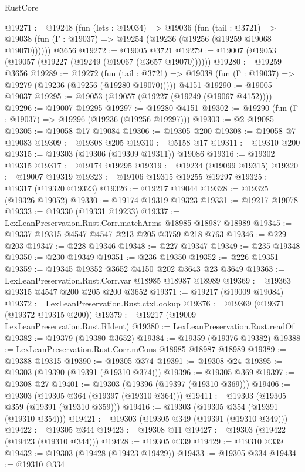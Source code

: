 \begin{lexlean}{RustCore}
\begin{coremodule}
@19271 := @19248
    (fun (lets : @19034) =>
    @19036
      (fun (tail : @3721) =>
      @19038 (fun (Γ : @19037) => @19254 (@19236 (@19256 (@19259 @19068 @19070))))))
    @3656
@19272 := @19005 @3721
@19279 := @19007 (@19053 (@19057 (@19227 (@19249 (@19067 (@3657 @19070))))))
@19280 := @19259 @3656
@19289 := @19272
    (fun (tail : @3721) => @19038 (fun (Γ : @19037) => @19279 (@19236 (@19256 (@19280 @19070)))))
    @4151
@19290 := @19005 @19037
@19295 := @19053 (@19057 (@19227 (@19249 (@19067 @4152))))
@19296 := @19007 @19295
@19297 := @19280 @4151
@19302 := @19290 (fun (Γ : @19037) => @19296 (@19236 (@19256 @19297)))
@19303 := @2 @19085
@19305 := @19058 @17 @19084
@19306 := @19305 @200
@19308 := @19058 @7 @19083
@19309 := @19308 @205
@19310 := @5158 @17
@19311 := @19310 @200
@19315 := @19303 (@19306 (@19309 @19311)) @19086
@19316 := @19302 @19315
@19317 := @19174 @19295
@19319 := @19234 (@19099 @19315)
@19320 := @19007 @19319
@19323 := @19106 @19315 @19255 @19297
@19325 := @19317 (@19320 @19323)
@19326 := @19217 @19044
@19328 := @19325 (@19326 @19052)
@19330 := @19174 @19319 @19323
@19331 := @19217 @19078
@19333 := @19330 (@19331 @19233)
@19337 := LexLeanPreservation.Rust.Corr.matchArms @18985 @18987 @18989
@19345 := @19337 @19315 @4547 @4547 @213 @205 @3759 @218 @763
@19346 := @229 @203
@19347 := @228 @19346
@19348 := @227 @19347
@19349 := @235 @19348
@19350 := @230 @19349
@19351 := @236 @19350
@19352 := @226 @19351
@19359 := @19345 @19352 @3652 @4150 @202 @3643 @23 @3649
@19363 := LexLeanPreservation.Rust.Corr.var @18985 @18987 @18989
@19369 := @19363 @19315 @4547 @200 @205 @200 @3652
@19371 := @19217 (@19009 @19084)
@19372 := LexLeanPreservation.Rust.ctxLookup
@19376 := @19369 (@19371 (@19372 @19315 @200))
@19379 := @19217 (@19009 LexLeanPreservation.Rust.RIdent)
@19380 := LexLeanPreservation.Rust.readOf
@19382 := @19379 (@19380 @3652)
@19384 := @19359 (@19376 @19382)
@19388 := LexLeanPreservation.Rust.Corr.mCons @18985 @18987 @18989
@19389 := @19388 @19315
@19390 := @19305 @374
@19391 := @19308 @24
@19395 := @19303 (@19390 (@19391 (@19310 @374)))
@19396 := @19305 @369
@19397 := @19308 @27
@19401 := @19303 (@19396 (@19397 (@19310 @369)))
@19406 := @19303 (@19305 @364 (@19397 (@19310 @364)))
@19411 := @19303 (@19305 @359 (@19391 (@19310 @359)))
@19416 := @19303 (@19305 @354 (@19391 (@19310 @354)))
@19421 := @19303 (@19305 @349 (@19391 (@19310 @349)))
@19422 := @19305 @344
@19423 := @19308 @11
@19427 := @19303 (@19422 (@19423 (@19310 @344)))
@19428 := @19305 @339
@19429 := @19310 @339
@19432 := @19303 (@19428 (@19423 @19429))
@19433 := @19305 @334
@19434 := @19310 @334

\end{coremodule}
\end{lexlean}
